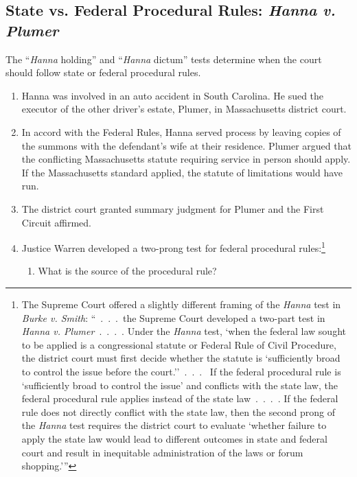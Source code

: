 \subsection{State vs. Federal Procedural Rules: \emph{Hanna v. Plumer}}

The ``\emph{Hanna} holding'' and ``\emph{Hanna} dictum'' tests determine when 
the court should follow state or federal procedural rules.

\begin{enumerate}
    \item Hanna was involved in an auto accident in South Carolina. He sued 
    the executor of the other driver's estate, Plumer, in Massachusetts 
    district court.
    \item In accord with the Federal Rules, Hanna served process by leaving 
    copies of the summons with the defendant's wife at their residence. Plumer 
    argued that the conflicting Massachusetts statute requiring service in 
    person should apply. If the Massachusetts standard applied, the statute of 
    limitations would have run.
    \item The district court granted summary judgment for Plumer and the First 
    Circuit affirmed.
    \item Justice Warren developed a two-prong test for federal procedural 
    rules:\footnote{The Supreme Court offered a slightly different framing of 
    the \emph{Hanna} test in \emph{Burke v. Smith}:
    \enquote{~.~.~.~the Supreme Court developed a two-part test in \emph{Hanna v.  
    Plumer}~.~.~.~. Under the \emph{Hanna} test, \enquote{when the federal law 
    sought to be applied is a congressional statute or Federal Rule of Civil 
    Procedure, the district court must first decide whether the statute is 
    `sufficiently broad to control the issue before the court.'}~.~.~.~  
    If the federal procedural rule is \enquote{sufficiently broad to control 
    the issue} and conflicts with the state law, the federal procedural rule 
    applies instead of the state law~.~.~.~. If the federal rule does not directly 
    conflict with the state law, then the second prong of the \emph{Hanna} 
    test requires the district court to evaluate \enquote{whether failure to 
    apply the state law would lead to different outcomes in state and federal 
    court and result in inequitable administration of the laws or forum 
    shopping.}}}
    \begin{enumerate}
        \item What is the source of the procedural rule?

\end{enumerate}
\end{enumerate}
